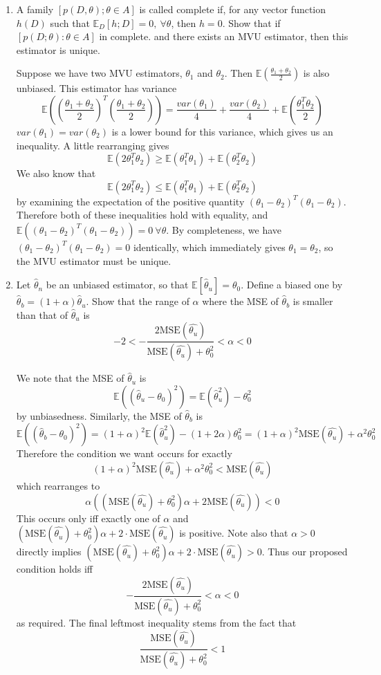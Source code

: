 \documentclass{article}
\newcommand{\chapternumber}{3}
\newenvironment{QandA}{\begin{enumerate}[label=\chapternumber.\arabic*]\bfseries\boldmath}
	{\end{enumerate}}
\newenvironment{answered}{\par\bigskip\normalfont\unboldmath}{}
\begin{document}
\begin{QandA}
		\item A family $[p(D,\theta);\theta\in A]$ is called complete if, for any vector function $h(D)$ such that $\mathbb{E}_D[h;D]=0,\ \forall\theta$, then $h=0$. Show that if $[p(D;\theta):\theta\in A]$ in complete. and there exists an MVU estimator, then this estimator is unique.
		\begin{answered}
			Suppose we have two MVU estimators, $\theta_1$ and $\theta_2$. Then $\mathbb{E}\left(\frac{\theta_1+\theta_2}{2}\right)$ is also unbiased. This estimator has variance
			\[\mathbb{E}\left(\left(\frac{\theta_1+\theta_2}{2}\right)^T\left(\frac{\theta_1+\theta_2}{2}\right)\right)=\frac{var(\theta_1)}{4}+\frac{var(\theta_2)}{4}+\mathbb{E}\left(\frac{\theta_1^T\theta_2}{2}\right)\]
			$var(\theta_1)=var(\theta_2)$ is a lower bound for this variance, which gives us an inequality. A little rearranging gives
			\[\mathbb{E}(2\theta_1^T\theta_2)\geq\mathbb{E}(\theta_1^T\theta_1)+\mathbb{E}(\theta_2^T\theta_2)\]
			We also know that
			\[\mathbb{E}(2\theta_1^T\theta_2)\leq\mathbb{E}(\theta_1^T\theta_1)+\mathbb{E}(\theta_2^T\theta_2)\]
			by examining the expectation of the positive quantity $(\theta_1-\theta_2)^T(\theta_1-\theta_2)$. Therefore both of these inequalities hold with equality, and $\mathbb{E}((\theta_1-\theta_2)^T(\theta_1-\theta_2))=0\ \forall \theta$. By completeness, we have $(\theta_1-\theta_2)^T(\theta_1-\theta_2)=0$ identically, which immediately gives $\theta_1=\theta_2$, so the MVU estimator must be unique.
		\end{answered}
	
		\item Let $\hat{\theta}_n$ be an unbiased estimator, so that $\mathbb{E}[\hat{\theta}_u]=\theta_0$. Define a biased one by $\hat{\theta}_b=(1+\alpha)\hat{\theta}_u$. Show that the range of $\alpha$ where the MSE of $\hat{\theta}_b$ is smaller than that of $\hat{\theta}_u$ is
		\[-2<-\frac{2\text{MSE}(\hat{\theta_u})}{\text{MSE}(\hat{\theta_u})+\theta_0^2}<\alpha<0\]
		\begin{answered}
			We note that the MSE of $\hat{\theta}_u$ is 
			\[\mathbb{E}((\hat{\theta}_u-\theta_0)^2)=\mathbb{E}(\hat{\theta}_u^2)-\theta_0^2\]
			by unbiasedness. Similarly, the MSE of $\hat{\theta}_b$ is
			\[\mathbb{E}((\hat{\theta}_b-\theta_0)^2)=(1+\alpha)^2\mathbb{E}(\hat{\theta}_u^2)-(1+2\alpha)\theta_0^2=(1+\alpha)^2\text{MSE}(\hat{\theta_u})+\alpha^2\theta_0^2\]
			Therefore the condition we want occurs for exactly
			\[(1+\alpha)^2\text{MSE}(\hat{\theta_u})+\alpha^2\theta_0^2<\text{MSE}(\hat{\theta_u})\]
			which rearranges to 
			\[\alpha((\text{MSE}(\hat{\theta_u})+\theta_0^2)\alpha+2\text{MSE}(\hat{\theta_u}))<0\]
			This occurs only iff exactly one of $\alpha$ and $(\text{MSE}(\hat{\theta_u})+\theta_0^2)\alpha+2\cdot\text{MSE}(\hat{\theta_u})$ is positive. Note also that $\alpha>0$ directly implies $(\text{MSE}(\hat{\theta_u})+\theta_0^2)\alpha+2\cdot\text{MSE}(\hat{\theta_u})>0$. Thus our proposed condition holds iff
			\[-\frac{2\text{MSE}(\hat{\theta_u})}{\text{MSE}(\hat{\theta_u})+\theta_0^2}<\alpha<0\]
			as required. The final leftmost inequality stems from the fact that 
			\[\frac{\text{MSE}(\hat{\theta_u})}{\text{MSE}(\hat{\theta_u})+\theta_0^2}<1\]
			

\end{answered}
\end{QandA}
\end{document}
